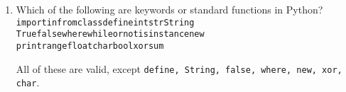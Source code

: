 \begin{enumerate}
\item Which of the following are keywords or standard functions in Python?\\
\texttt{import\hspace{10mm}in\hspace{10mm}from\hspace{10mm}class\hspace{10mm}define\hspace{10mm}int\hspace{10mm}str\hspace{10mm}String}\\
\texttt{True\hspace{9mm}false\hspace{9mm}where\hspace{9mm}while\hspace{9mm}or\hspace{9mm}not\hspace{9mm}isinstance\hspace{9mm}new}\\
\texttt{print\hspace{13mm}range\hspace{13mm}float\hspace{13mm}char\hspace{13mm}bool\hspace{13mm}xor\hspace{13mm}sum}\\

\begin{answer}
All of these are valid, except \texttt{define, String, false, where, new, xor, char}.
\end{answer}
\end{enumerate}




